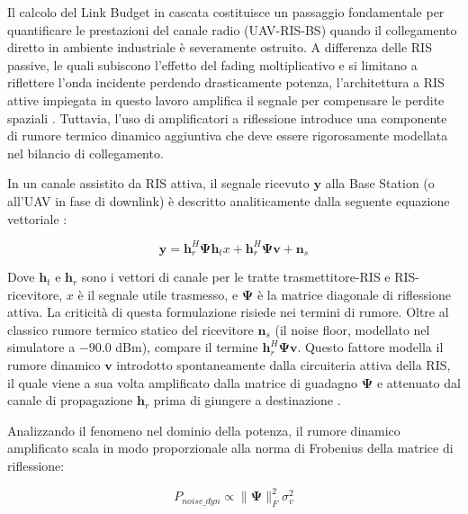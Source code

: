 \documentclass[twoside]{article}
\begin{document}
Il calcolo del Link Budget in cascata costituisce un passaggio fondamentale per quantificare le prestazioni del canale radio (UAV-RIS-BS) quando il collegamento diretto in ambiente industriale è severamente ostruito. A differenza delle RIS passive, le quali subiscono l'effetto del fading moltiplicativo e si limitano a riflettere l'onda incidente perdendo drasticamente potenza, l'architettura a RIS attive impiegata in questo lavoro amplifica il segnale per compensare le perdite spaziali \cite{Zhang2022}. Tuttavia, l'uso di amplificatori a riflessione introduce una componente di rumore termico dinamico aggiuntiva che deve essere rigorosamente modellata nel bilancio di collegamento.

In un canale assistito da RIS attiva, il segnale ricevuto $\mathbf{y}$ alla Base Station (o all'UAV in fase di downlink) è descritto analiticamente dalla seguente equazione vettoriale \cite{Zhang2022}:

\begin{equation}
\mathbf{y} = \mathbf{h}_{r}^H \mathbf{\Psi} \mathbf{h}_{t} x + \mathbf{h}_{r}^H \mathbf{\Psi} \mathbf{v} + \mathbf{n}_s
\label{eq:active_ris_signal}
\end{equation}

Dove $\mathbf{h}_{t}$ e $\mathbf{h}_{r}$ sono i vettori di canale per le tratte trasmettitore-RIS e RIS-ricevitore, $x$ è il segnale utile trasmesso, e $\mathbf{\Psi}$ è la matrice diagonale di riflessione attiva. La criticità di questa formulazione risiede nei termini di rumore. Oltre al classico rumore termico statico del ricevitore $\mathbf{n}_s$ (il noise floor, modellato nel simulatore a $-90.0$ dBm), compare il termine $\mathbf{h}_{r}^H \mathbf{\Psi} \mathbf{v}$. Questo fattore modella il rumore dinamico $\mathbf{v}$ introdotto spontaneamente dalla circuiteria attiva della RIS, il quale viene a sua volta amplificato dalla matrice di guadagno $\mathbf{\Psi}$ e attenuato dal canale di propagazione $\mathbf{h}_{r}$ prima di giungere a destinazione \cite{Zhang2022}.

Analizzando il fenomeno nel dominio della potenza, il rumore dinamico amplificato scala in modo proporzionale alla norma di Frobenius della matrice di riflessione:

\begin{equation}
P_{noise\_dyn} \propto \|\mathbf{\Psi}\|_F^2 \sigma_v^2
\label{eq:dynamic_noise_power}
\end{equation}
\end{document}
